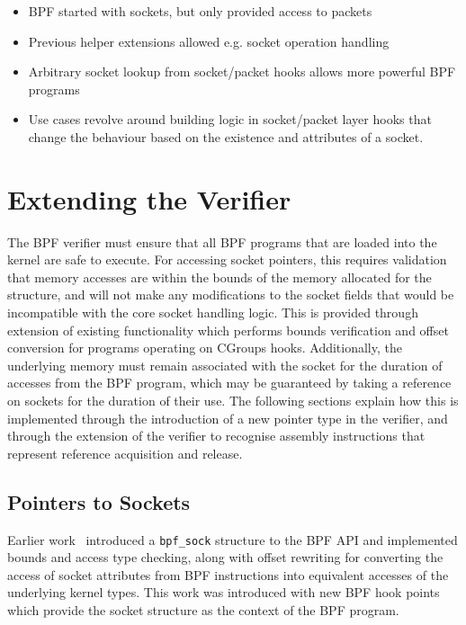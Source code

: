 \documentclass[10pt,sigconf,authorversion]{lpc}
\begin{document}
\begin{itemize}
\item BPF started with sockets, but only provided access to packets
\item Previous helper extensions allowed e.g. socket operation handling
\item Arbitrary socket lookup from socket/packet hooks allows more powerful BPF
      programs
\item Use cases revolve around building logic in socket/packet layer hooks that
      change the behaviour based on the existence and attributes of a socket.
\end{itemize}

\section{Extending the Verifier}


The BPF verifier must ensure that all BPF programs that are loaded into the
kernel are safe to execute. For accessing socket pointers, this requires
validation that memory accesses are within the bounds of the memory allocated
for the structure, and will not make any modifications to the socket fields
that would be incompatible with the core socket handling logic. This is
provided through extension of existing functionality which performs bounds
verification and offset conversion for programs operating on CGroups hooks.
Additionally, the underlying memory must remain associated with the socket for
the duration of accesses from the BPF program, which may be guaranteed by
taking a reference on sockets for the duration of their use. The following
sections explain how this is implemented through the introduction of a new
pointer type in the verifier, and through the extension of the verifier to
recognise assembly instructions that represent reference acquisition and
release.

\subsection{Pointers to Sockets}

Earlier work~\cite{bpf-sock} introduced a \verb+bpf_sock+ structure to the BPF
API and implemented bounds and access type checking, along with offset
rewriting for converting the access of socket attributes from BPF instructions
into equivalent accesses of the underlying kernel types. This work was
introduced with new BPF hook points which provide the socket structure as the
context of the BPF program.
\end{document}
